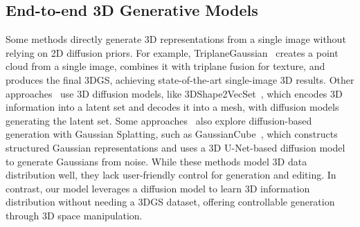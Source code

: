 \subsection{End-to-end 3D Generative Models}
\label{sec:related_3d}
Some methods \cite{tochilkin2024triposr,zou2024triplane,hong2023lrm} directly generate 3D representations from a single image without relying on 2D diffusion priors. For example, TriplaneGaussian~\cite{zou2024triplane} creates a point cloud from a single image, combines it with triplane fusion for texture, and produces the final 3DGS, achieving state-of-the-art single-image 3D results. Other approaches~\cite{zhang2024clay,zhang20233dshape2vecset,zhao2024michelangelo,gupta20233dgen,nichol2022point,muller2023diffrf} use 3D diffusion models, like 3DShape2VecSet~\cite{zhang20233dshape2vecset}, which encodes 3D information into a latent set and decodes it into a mesh, with diffusion models generating the latent set. Some approaches~\cite{zhang2024gaussiancube,zhou2024diffgs,he2025gvgen,xiang2024structured} also explore diffusion-based generation with Gaussian Splatting, such as GaussianCube~\cite{zhang2024gaussiancube}, which constructs structured Gaussian representations and uses a 3D U-Net-based diffusion model to generate Gaussians from noise. While these methods model 3D data distribution well, they lack user-friendly control for generation and editing. In contrast, our model leverages a diffusion model to learn 3D information distribution without needing a 3DGS dataset, offering controllable generation through 3D space manipulation.


